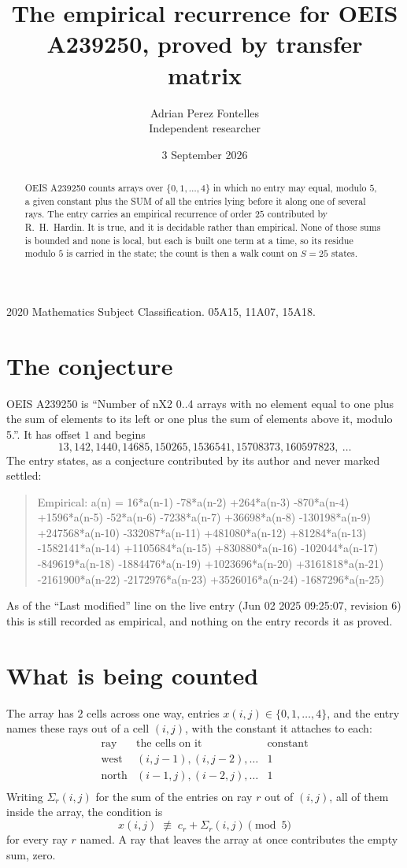 \documentclass[11pt,a4paper]{article}
\title{The empirical recurrence for OEIS A239250, proved by transfer matrix}
\author{Adrian Perez Fontelles\\ \small Independent researcher}
\date{3 September 2026}
\theoremstyle{plain}
\theoremstyle{definition}
\begin{document}
\maketitle

\begin{abstract}
OEIS A239250 counts arrays over $\{0,1,\dots,4\}$ in which no entry may equal, modulo $5$, a given
constant plus the SUM of all the entries lying before it along one of several rays. The entry
carries an empirical recurrence of order $25$ contributed by R.~H.~Hardin. It is true, and
it is decidable rather than empirical. None of those sums is bounded and none is local, but
each is built one term at a time, so its residue modulo $5$ is carried in the state; the
count is then a walk count on $S=25$ states.
\end{abstract}

\noindent\small 2020 Mathematics Subject Classification. 05A15, 11A07, 15A18.\normalsize

\section{The conjecture}

OEIS A239250 is ``Number of nX2 0..4 arrays with no element equal to one plus the sum of elements to its left or one plus the sum of elements above it, modulo 5.''. It has offset $1$ and begins
\[
13, 142, 1440, 14685, 150265, 1536541, 15708373, 160597823,\ \dots
\]
The entry states, as a conjecture contributed by its author and never marked settled:
\begin{quote}
Empirical: a(n) = 16*a(n-1) -78*a(n-2) +264*a(n-3) -870*a(n-4) +1596*a(n-5) -52*a(n-6) -7238*a(n-7) +36698*a(n-8) -130198*a(n-9) +247568*a(n-10) -332087*a(n-11) +481080*a(n-12) +81284*a(n-13) -1582141*a(n-14) +1105684*a(n-15) +830880*a(n-16) -102044*a(n-17) -849619*a(n-18) -1884476*a(n-19) +1023696*a(n-20) +3161818*a(n-21) -2161900*a(n-22) -2172976*a(n-23) +3526016*a(n-24) -1687296*a(n-25)
\end{quote}
As of the ``Last modified'' line on the live entry (Jun 02 2025 09:25:07, revision 6) this is still
recorded as empirical, and nothing on the entry records it as proved.

\section{What is being counted}

The array has $2$ cells across one way, entries $x(i,j)\in\{0,1,\dots,4\}$, and the entry names these
rays out of a cell $(i,j)$, with the constant it attaches to each:
\[
\begin{array}{lll}
\text{ray} & \text{the cells on it} & \text{constant} \\[2pt]
\text{west} & (i,j-1),(i,j-2),\dots & 1 \\
\text{north} & (i-1,j),(i-2,j),\dots & 1 \\
\end{array}
\]
Writing $\Sigma_r(i,j)$ for the sum of the entries on ray $r$ out of $(i,j)$, all of them
inside the array, the condition is
\[
x(i,j)\;\not\equiv\;c_r+\Sigma_r(i,j) \pmod{5}
\]
for every ray $r$ named. A ray that leaves the array at once contributes the empty sum,
zero.
\end{document}
